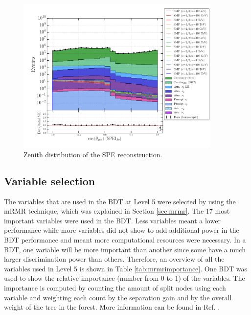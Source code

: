 \begin{figure}
\centering
\includegraphics[width=0.9\textwidth]{chapter8/img/1D_stack_spefit1_hc_coszenith_foefelare}
\caption{Zenith distribution of the SPE reconstruction.}
\label{fig:remainingvariableszenith}
\end{figure}




\subsection{Variable selection}
The variables that are used in the BDT at Level 5 were selected by using the mRMR technique, which was explained in Section \ref{sec:mrmr}. The 17 most important variables were used in the BDT. Less variables meant a lower performance while more variables did not show to add additional power in the BDT performance and meant more computational resources were necessary. In a BDT, one variable will be more important than another since some have a much larger discrimination power than others. Therefore, an overview of all the variables used in Level 5 is shown in Table \ref{tab:mrmrimportance}. One BDT was used to show the relative importance (number from 0 to 1) of the variables. The importance is computed by counting the amount of split nodes using each
variable and weighting each count by the separation gain and by the overall weight of the tree in the forest. More information can be found in Ref. \cite{pybdturl}.

